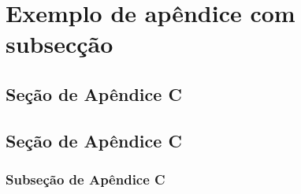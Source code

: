 %
%
%
%
%
\chapter{Exemplo de apêndice com subsecção}


\section{Seção de Apêndice C}



\section{Seção de Apêndice C}



\subsection{Subseção de Apêndice C}